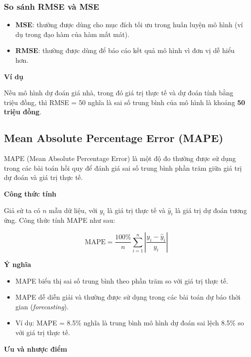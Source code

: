 \subsubsection*{So sánh RMSE và MSE}

\begin{itemize}
    \item \textbf{MSE}: thường được dùng cho mục đích tối ưu trong huấn luyện mô hình (ví dụ trong đạo hàm của hàm mất mát).
    \item \textbf{RMSE}: thường được dùng để báo cáo kết quả mô hình vì đơn vị dễ hiểu hơn.
\end{itemize}

\textbf{Ví dụ}

Nếu mô hình dự đoán giá nhà, trong đó giá trị thực tế và dự đoán tính bằng triệu đồng, thì RMSE = 50 nghĩa là sai số trung bình của mô hình là khoảng \textbf{50 triệu đồng}.


\subsection {Mean Absolute Percentage Error (MAPE)}
\label{eval:mape}
MAPE (Mean Absolute Percentage Error) là một độ đo thường được sử dụng trong các bài toán hồi quy để đánh giá sai số trung bình phần trăm giữa giá trị dự đoán và giá trị thực tế.

\textbf{Công thức tính}

Giả sử ta có $n$ mẫu dữ liệu, với $y_i$ là giá trị thực tế và $\hat{y}_i$ là giá trị dự đoán tương ứng. Công thức tính MAPE như sau:

\begin{equation}
\text{MAPE} = \frac{100\%}{n} \sum_{i=1}^{n} \left| \frac{y_i - \hat{y}_i}{y_i} \right|
\end{equation}

\textbf{Ý nghĩa}

\begin{itemize}
    \item MAPE biểu thị sai số trung bình theo phần trăm so với giá trị thực tế.
    \item MAPE dễ diễn giải và thường được sử dụng trong các bài toán dự báo thời gian (\textit{forecasting}).
    \item Ví dụ: MAPE = 8.5\% nghĩa là trung bình mô hình dự đoán sai lệch 8.5\% so với giá trị thực tế.
\end{itemize}

\textbf{Ưu và nhược điểm}

